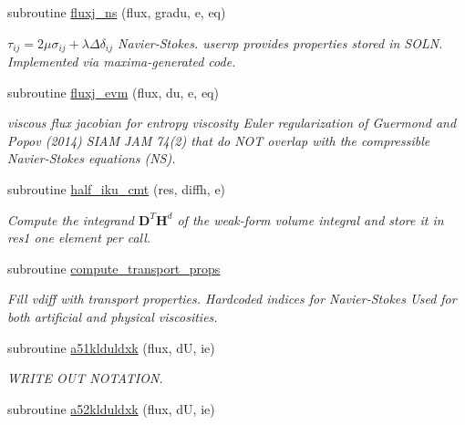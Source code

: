 \begin{DoxyCompactItemize}
subroutine \hyperlink{group__vfjac_ga2c0d85531a9af69b9d464571ca530e5d}{fluxj\-\_\-ns} (flux, gradu, e, eq)
\begin{DoxyCompactList}\small\item\em $ \tau_{ij}=2 \mu\sigma_{ij} + \lambda \Delta \delta_{ij}$ Navier-\/\-Stokes. uservp provides properties stored in S\-O\-L\-N. Implemented via maxima-\/generated code. \end{DoxyCompactList}\item 
\hypertarget{diffusive__cmt_8f_a1c3683ff121ed541c445d78e7d86e85b}{subroutine \hyperlink{diffusive__cmt_8f_a1c3683ff121ed541c445d78e7d86e85b}{fluxj\-\_\-evm} (flux, du, e, eq)}\label{diffusive__cmt_8f_a1c3683ff121ed541c445d78e7d86e85b}

\begin{DoxyCompactList}\small\item\em viscous flux jacobian for entropy viscosity Euler regularization of Guermond and Popov (2014) S\-I\-A\-M J\-A\-M 74(2) that do N\-O\-T overlap with the compressible Navier-\/\-Stokes equations (N\-S). \end{DoxyCompactList}\item 
subroutine \hyperlink{group__diffhvol_ga90ef567419c8aa503af50a7e747c884e}{half\-\_\-iku\-\_\-cmt} (res, diffh, e)
\begin{DoxyCompactList}\small\item\em Compute the integrand $\mathbf{D}^{T}\mathbf{H}^d$ of the weak-\/form volume integral and store it in res1 one element per call. \end{DoxyCompactList}\item 
subroutine \hyperlink{group__vfjac_ga15f8f8f0e3d305dc065f004aa09de57c}{compute\-\_\-transport\-\_\-props}
\begin{DoxyCompactList}\small\item\em Fill vdiff with transport properties. Hardcoded indices for Navier-\/\-Stokes Used for both artificial and physical viscosities. \end{DoxyCompactList}\item 
\hypertarget{group__vfjac_ga34cccfbb67ddce8c68e7f2742a94af96}{subroutine \hyperlink{group__vfjac_ga34cccfbb67ddce8c68e7f2742a94af96}{a51klduldxk} (flux, d\-U, ie)}\label{group__vfjac_ga34cccfbb67ddce8c68e7f2742a94af96}

\begin{DoxyCompactList}\small\item\em W\-R\-I\-T\-E O\-U\-T N\-O\-T\-A\-T\-I\-O\-N. \end{DoxyCompactList}\item 
\hypertarget{group__vfjac_gad8d6f5b90772f9f1082fba425cece421}{subroutine \hyperlink{group__vfjac_gad8d6f5b90772f9f1082fba425cece421}{a52klduldxk} (flux, d\-U, ie)}\label{group__vfjac_gad8d6f5b90772f9f1082fba425cece421}


\end{DoxyCompactItemize}
